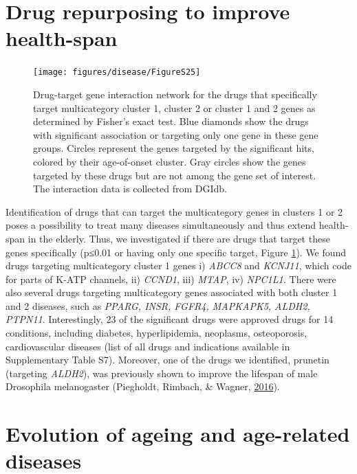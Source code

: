 \documentclass[12pt,twoside]{unicam}
\begin{document}
\hypertarget{drug-repurposing-to-improve-health-span}{%
\section{Drug repurposing to improve health-span}\label{drug-repurposing-to-improve-health-span}}

\begin{figure}

{\centering \texttt{[image: figures/disease/FigureS25]} 

}

\caption[Drug-target gene interaction network for the drugs specific to multicategory age-dependent diseases.]{Drug-target gene interaction network for the drugs that specifically target multicategory cluster 1, cluster 2 or cluster 1 and 2 genes as determined by Fisher's exact test. Blue diamonds show the drugs with significant association or targeting only one gene in these gene groups. Circles represent the genes targeted by the significant hits, colored by their age-of-onset cluster. Gray circles show the genes targeted by these drugs but are not among the gene set of interest. The interaction data is collected from DGIdb.}\label{fig:disFigS25}
\end{figure}

Identification of drugs that can target the multicategory genes in clusters 1 or 2 poses a possibility to treat many diseases simultaneously and thus extend health-span in the elderly. Thus, we investigated if there are drugs that target these genes specifically (p≤0.01 or having only one specific target, Figure \ref{fig:disFigS25}). We found drugs targeting multicategory cluster 1 genes i) \emph{ABCC8} and \emph{KCNJ11}, which code for parts of K-ATP channels, ii) \emph{CCND1}, iii) \emph{MTAP}, iv) \emph{NPC1L1.} There were also several drugs targeting multicategory genes associated with both cluster 1 and 2 diseases, such as \emph{PPARG, INSR, FGFR4, MAPKAPK5, ALDH2, PTPN11}. Interestingly, 23 of the significant drugs were approved drugs for 14 conditions, including diabetes, hyperlipidemia, neoplasms, osteoporosis, cardiovascular diseases (list of all drugs and indications available in Supplementary Table S7). Moreover, one of the drugs we identified, prunetin (targeting \emph{ALDH2}), was previously shown to improve the lifespan of male Drosophila melanogaster (Piegholdt, Rimbach, \& Wagner, \protect\hyperlink{ref-Piegholdt2016}{2016}).

\hypertarget{evolution-of-ageing-and-age-related-diseases}{%
\section{Evolution of ageing and age-related diseases}\label{evolution-of-ageing-and-age-related-diseases}}
\end{document}
